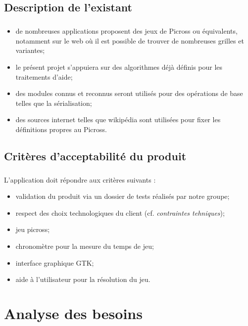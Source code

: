 \section{Description de l'existant}
	\paragraph*{}
	\begin{itemize}
		\item de nombreuses applications proposent des jeux de Picross ou équivalents, notamment sur le web où il est possible de trouver de nombreuses grilles et variantes;
		\item le présent projet s'appuiera sur des algorithmes déjà définis pour les traitements d'aide;
		\item des modules connus et reconnus seront utilisés pour des opérations de base telles que la sérialisation;
		\item des sources internet telles que wikipédia sont utilisées pour fixer les définitions propres au Picross.
	\end{itemize}


\section{Critères d'acceptabilité du produit}
	\paragraph*{}
	L'application doit répondre aux critères suivants :
	\begin{itemize}
		\item validation du produit via un dossier de tests réalisés par notre groupe;
		\item respect des choix technologiques du client (cf. \textit{contraintes tehniques});
		\item jeu picross;
		\item chronomètre pour la mesure du temps de jeu;
		\item interface graphique GTK;
		\item aide à l'utilisateur pour la résolution du jeu.
	\end{itemize}




\chapter{Analyse des besoins} 


